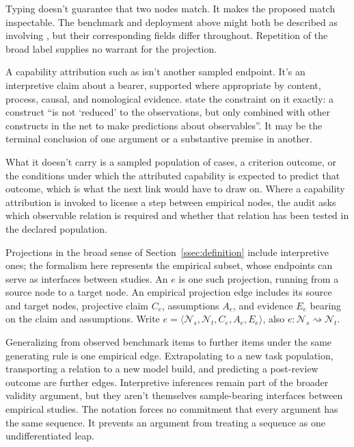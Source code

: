 \documentclass[12pt]{article}
\begin{document}
Typing doesn't guarantee that two nodes match. It makes the proposed match inspectable. The benchmark and deployment above might both be described as involving , but their corresponding fields differ throughout. Repetition of the broad label supplies no warrant for the projection.

A capability attribution such as  isn't another sampled endpoint. It's an interpretive claim about a bearer, supported where appropriate by content, process, causal, and nomological evidence. \Textcite[290]{cronbach1955construct} state the constraint on it exactly: a construct \enquote{is not \enquote{reduced} to the observations, but only combined with other constructs in the net to make predictions about observables}. It may be the terminal conclusion of one argument or a substantive premise in another.

What it doesn't carry is a sampled population of cases, a criterion outcome, or the conditions under which the attributed capability is expected to predict that outcome, which is what the next link would have to draw on. Where a capability attribution is invoked to license a step between empirical nodes, the audit asks which observable relation is required and whether that relation has been tested in the declared population.

Projections in the broad sense of Section~\ref{ssec:definition} include interpretive ones; the formalism here represents the empirical subset, whose endpoints can serve as interfaces between studies. An  \(e\) is one such projection, running from a source node to a target node. An empirical projection edge includes its source and target nodes, projective claim \(C_e\), assumptions \(A_e\), and evidence \(E_e\) bearing on the claim and assumptions. Write \(e=\langle\mathcal{N}_s,\mathcal{N}_t,C_e,A_e,E_e\rangle\), also \(e:\mathcal{N}_s\rightsquigarrow\mathcal{N}_t\).

Generalizing from observed benchmark items to further items under the same generating rule is one empirical edge. Extrapolating to a new task population, transporting a relation to a new model build, and predicting a post-review outcome are further edges. Interpretive inferences remain part of the broader validity argument, but they aren't themselves sample-bearing interfaces between empirical studies. The notation forces no commitment that every argument has the same sequence. It prevents an argument from treating a sequence as one undifferentiated leap.
\end{document}
